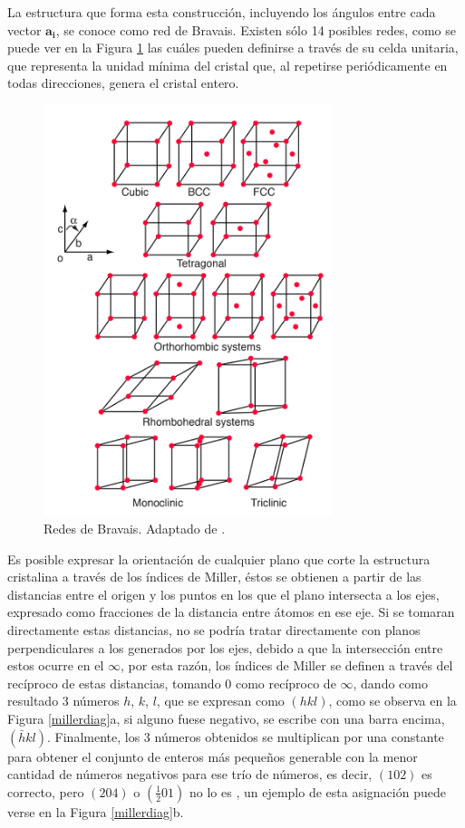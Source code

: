 \documentclass[../main.tex]{subfiles}
\begin{document}
La estructura que forma esta construcción, incluyendo los ángulos entre cada vector $\pmb{a_i}$, se conoce como red de Bravais. Existen sólo 14 posibles redes, como se puede ver en la Figura \ref{bravais} las cuáles pueden definirse a través de su celda unitaria, que representa la unidad mínima del cristal que, al repetirse periódicamente en todas direcciones, genera el cristal entero.
\begin{figure}[H]
    \centering
    \includegraphics[width=0.75\textwidth]{fig/bravais.png}
    \caption{Redes de Bravais. Adaptado de \cite{ScienceFacts2024}.}
    \label{bravais}
\end{figure}
Es posible expresar la orientación de cualquier plano que corte la estructura cristalina a través de los índices de Miller, éstos se obtienen a partir de las distancias entre el origen y los puntos en los que el plano intersecta a los ejes, expresado como fracciones de la distancia entre átomos en ese eje. Si se tomaran directamente estas distancias, no se podría tratar directamente con planos perpendiculares a los generados por los ejes, debido a que la intersección entre estos ocurre en el $\infty$, por esta razón, los índices de Miller se definen a través del recíproco de estas distancias, tomando 0 como recíproco de $\infty$, dando como resultado 3 números $h$, $k$, $l$, que se expresan como $(hkl)$, como se observa en la Figura \ref{millerdiag}a, si alguno fuese negativo, se escribe con una barra encima, $\left(\bar{h}kl\right)$. Finalmente, los 3 números obtenidos se multiplican por una constante para obtener el conjunto de enteros más pequeños generable con la menor cantidad de números negativos para ese trío de números, es decir, $(102)$ es correcto, pero $(204)$ o $\left(\frac{1}{2}01\right)$ no lo es \cite{Cullity2014}, un ejemplo de esta asignación puede verse en la Figura \ref{millerdiag}b.
\end{document}
